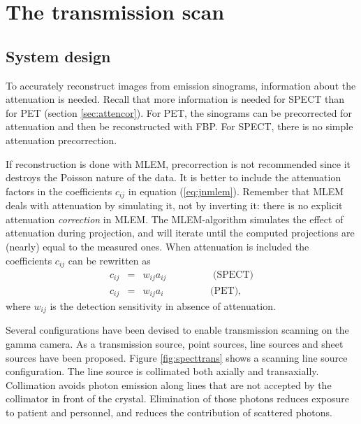 \chapter{The transmission scan \label{ch:trans}}


\section{System design}
To accurately reconstruct images from emission sinograms, information about
the attenuation is needed. Recall that more information is needed for SPECT
than for PET (section \ref{sec:attencor}). For PET, the
sinograms can be precorrected for attenuation and then be reconstructed with
FBP. For SPECT, there is no simple attenuation precorrection.

If reconstruction is done with MLEM, precorrection is not recommended since it
destroys the Poisson nature of the data. It is better to include the
attenuation factors in the coefficients $c_{ij}$ in equation
(\ref{eq:jnmlem}). Remember that MLEM deals with attenuation by simulating it,
not by inverting it: there is no explicit attenuation {\em correction} in
MLEM. The MLEM-algorithm simulates the effect of attenuation during
projection, and will iterate until the computed projections are (nearly) equal
to the measured ones. When attenuation is included the coefficients $c_{ij}$
can be rewritten as
\begin{eqnarray}
  c_{ij} & = & w_{ij} a_{ij} \hspace{2cm} \mbox{(SPECT)}\\
  c_{ij} & = & w_{ij} a_{i}  \hspace{2cm} \mbox{(PET)},
\end{eqnarray}
where $w_{ij}$ is the detection sensitivity in absence of attenuation.

Several configurations have been devised to enable transmission
scanning on the gamma camera. As a transmission source, point sources,
line sources and sheet sources have been proposed. Figure
\ref{fig:specttrans} shows a scanning line source configuration. The
line source is collimated both axially and transaxially. Collimation
avoids photon emission along lines that are not accepted by the
collimator in front of the crystal. Elimination of those photons
reduces exposure to patient and personnel, and reduces the
contribution of scattered photons.

